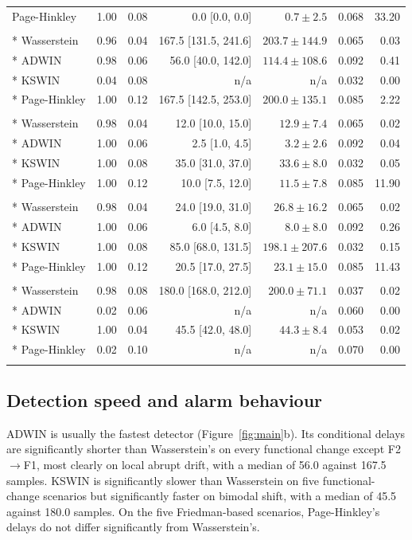 \documentclass[preprint,12pt]{elsarticle}
\begin{document}
\begin{longtable}{lrrrrrr}
Page-Hinkley & 1.00 & 0.08 & 0.0 [0.0, 0.0] & $0.7 \pm 2.5$ & 0.068 & 33.20\\
\addlinespace
\multicolumn{7}{l}{\textit{Local abrupt (LEA)}}\\*
Wasserstein & 0.96 & 0.04 & 167.5 [131.5, 241.6] & $203.7 \pm 144.9$ & 0.065 & 0.03\\*
ADWIN & 0.98 & 0.06 & 56.0 [40.0, 142.0] & $114.4 \pm 108.6$ & 0.092 & 0.41\\*
KSWIN & 0.04 & 0.08 & n/a & n/a & 0.032 & 0.00\\*
Page-Hinkley & 1.00 & 0.12 & 167.5 [142.5, 253.0] & $200.0 \pm 135.1$ & 0.085 & 2.22\\
\addlinespace
\multicolumn{7}{l}{\textit{Global abrupt (GSG)}}\\*
Wasserstein & 0.98 & 0.04 & 12.0 [10.0, 15.0] & $12.9 \pm 7.4$ & 0.065 & 0.02\\*
ADWIN & 1.00 & 0.06 & 2.5 [1.0, 4.5] & $3.2 \pm 2.6$ & 0.092 & 0.04\\*
KSWIN & 1.00 & 0.08 & 35.0 [31.0, 37.0] & $33.6 \pm 8.0$ & 0.032 & 0.05\\*
Page-Hinkley & 1.00 & 0.12 & 10.0 [7.5, 12.0] & $11.5 \pm 7.8$ & 0.085 & 11.90\\
\addlinespace
\multicolumn{7}{l}{\textit{Transition 500}}\\*
Wasserstein & 0.98 & 0.04 & 24.0 [19.0, 31.0] & $26.8 \pm 16.2$ & 0.065 & 0.02\\*
ADWIN & 1.00 & 0.06 & 6.0 [4.5, 8.0] & $8.0 \pm 8.0$ & 0.092 & 0.26\\*
KSWIN & 1.00 & 0.08 & 85.0 [68.0, 131.5] & $198.1 \pm 207.6$ & 0.032 & 0.15\\*
Page-Hinkley & 1.00 & 0.12 & 20.5 [17.0, 27.5] & $23.1 \pm 15.0$ & 0.085 & 11.43\\
\addlinespace
\multicolumn{7}{l}{\textit{Bimodal shift}}\\*
Wasserstein & 0.98 & 0.08 & 180.0 [168.0, 212.0] & $200.0 \pm 71.1$ & 0.037 & 0.02\\*
ADWIN & 0.02 & 0.06 & n/a & n/a & 0.060 & 0.00\\*
KSWIN & 1.00 & 0.04 & 45.5 [42.0, 48.0] & $44.3 \pm 8.4$ & 0.053 & 0.02\\*
Page-Hinkley & 0.02 & 0.10 & n/a & n/a & 0.070 & 0.00\\
\addlinespace
\end{longtable}\endgroup

\subsection{Detection speed and alarm behaviour}
\label{sec:speed}
ADWIN is usually the fastest detector (Figure~\ref{fig:main}b). Its conditional delays are significantly shorter than Wasserstein's on every functional change except F2$\to$F1, most clearly on local abrupt drift, with a median of 56.0 against 167.5 samples. KSWIN is significantly slower than Wasserstein on five functional-change scenarios but significantly faster on bimodal shift, with a median of 45.5 against 180.0 samples. On the five Friedman-based scenarios, Page-Hinkley's delays do not differ significantly from Wasserstein's.
\end{document}
